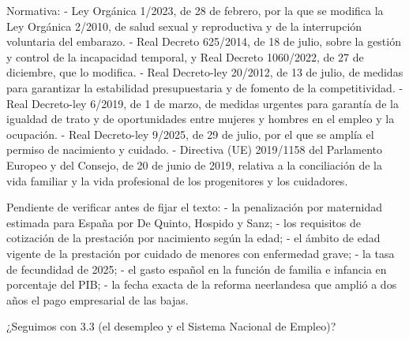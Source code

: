 \documentclass[10pt,a4paper]{article}
\begin{document}
Normativa:
- Ley Orgánica 1/2023, de 28 de febrero, por la que se modifica la Ley Orgánica 2/2010, de salud sexual y reproductiva y de la interrupción voluntaria del embarazo.
- Real Decreto 625/2014, de 18 de julio, sobre la gestión y control de la incapacidad temporal, y Real Decreto 1060/2022, de 27 de diciembre, que lo modifica.
- Real Decreto-ley 20/2012, de 13 de julio, de medidas para garantizar la estabilidad presupuestaria y de fomento de la competitividad.
- Real Decreto-ley 6/2019, de 1 de marzo, de medidas urgentes para garantía de la igualdad de trato y de oportunidades entre mujeres y hombres en el empleo y la ocupación.
- Real Decreto-ley 9/2025, de 29 de julio, por el que se amplía el permiso de nacimiento y cuidado.
- Directiva (UE) 2019/1158 del Parlamento Europeo y del Consejo, de 20 de junio de 2019, relativa a la conciliación de la vida familiar y la vida profesional de los progenitores y los cuidadores.

Pendiente de verificar antes de fijar el texto:
- la penalización por maternidad estimada para España por De Quinto, Hospido y Sanz;
- los requisitos de cotización de la prestación por nacimiento según la edad;
- el ámbito de edad vigente de la prestación por cuidado de menores con enfermedad grave;
- la tasa de fecundidad de 2025;
- el gasto español en la función de familia e infancia en porcentaje del PIB;
- la fecha exacta de la reforma neerlandesa que amplió a dos años el pago empresarial de las bajas.

¿Seguimos con 3.3 (el desempleo y el Sistema Nacional de Empleo)?
\end{document}
